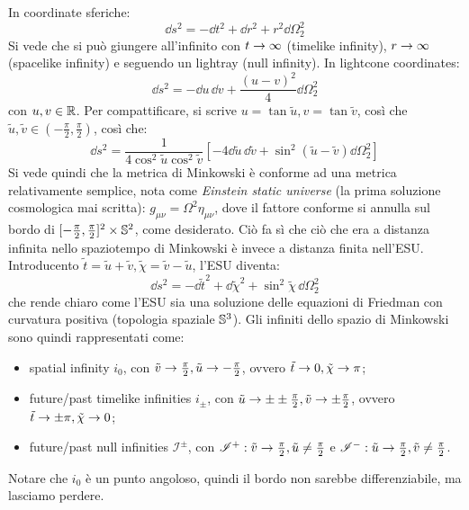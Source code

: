 In coordinate sferiche:
\begin{equation*}
  \dd s^2 = - \dd t^2 + \dd r^2 + r^2 \dd \Omega_2^2
\end{equation*}
Si vede che si può giungere all'infinito con $ t \rightarrow \infty $ (timelike infinity), $ r \rightarrow \infty $ (spacelike infinity) e seguendo un lightray (null infinity). In lightcone coordinates:
\begin{equation*}
  \dd s^2 = - \dd u \, \dd v + \frac{(u - v)^2}{4} \dd \Omega_2^2
\end{equation*}
con $ u , v \in \mathbb{R} $. Per compattificare, si scrive $ u = \tan \tilde{u} , v = \tan \tilde{v} $, così che $ \tilde{u} , \tilde{v} \in \left( - \frac{\pi}{2} , \frac{\pi}{2} \right) $, così che:
\begin{equation*}
  \dd s^2 = \frac{1}{4 \cos^2 \tilde{u} \cos^2 \tilde{v}} \left[ - 4 \dd \tilde{u} \, \dd \tilde{v} + \sin^2 (\tilde{u} - \tilde{v}) \dd \Omega_2^2 \right]
\end{equation*}
Si vede quindi che la metrica di Minkowski è conforme ad una metrica relativamente semplice, nota come \emph{Einstein static universe} (la prima soluzione cosmologica mai scritta): $ g_{\mu \nu} = \Omega^2 \eta_{\mu \nu} $, dove il fattore conforme si annulla sul bordo di $ [-\frac{\pi}{2} , \frac{\pi}{2}]^2 \times \mathbb{S}^{2} $, come desiderato. Ciò fa sì che ciò che era a distanza infinita nello spaziotempo di Minkowski è invece a distanza finita nell'ESU. Introducento $ \tilde{t} = \tilde{u} + \tilde{v} , \tilde{\chi} = \tilde{v} - \tilde{u} $, l'ESU diventa:
\begin{equation*}
  \dd s^2 = - \dd \tilde{t}^2 + \dd \tilde{\chi}^2 + \sin^2 \tilde{\chi} \, \dd \Omega_2^2
\end{equation*}
che rende chiaro come l'ESU sia una soluzione delle equazioni di Friedman con curvatura positiva (topologia spaziale $ \mathbb{S}^{3} $). Gli infiniti dello spazio di Minkowski sono quindi rappresentati come:
\begin{itemize}
  \item spatial infinity $ i_0 $, con $ \tilde{v} \rightarrow \frac{\pi}{2} , \tilde{u} \rightarrow - \frac{\pi}{2} $, ovvero $ \tilde{t} \rightarrow 0 , \tilde{\chi} \rightarrow \pi $;
  \item future/past timelike infinities $ i_\pm $, con $ \tilde{u} \rightarrow \pm \pm \frac{\pi}{2} , \tilde{v} \rightarrow \pm \frac{\pi}{2} $, ovvero $ \tilde{t} \rightarrow \pm \pi , \tilde{\chi} \rightarrow 0 $;
  \item future/past null infinities $ \mathscr{I}^\pm $, con $ \mathscr{I}^+ : \tilde{v} \rightarrow \frac{\pi}{2} , \tilde{u} \neq \frac{\pi}{2} $ e $ \mathscr{I}^- : \tilde{u} \rightarrow \frac{\pi}{2} , \tilde{v} \neq \frac{\pi}{2} $.
\end{itemize}
Notare che $ i_0 $ è un punto angoloso, quindi il bordo non sarebbe differenziabile, ma lasciamo perdere.


